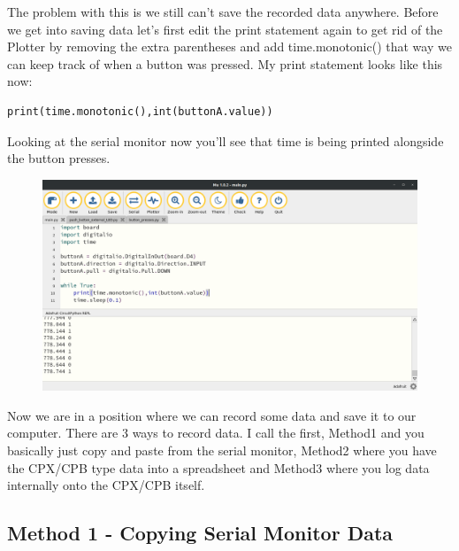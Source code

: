 The problem with this is we still can’t save the recorded data
anywhere. Before we get into saving data let’s first edit the print
statement again to get rid of the Plotter by removing the extra
parentheses and add time.monotonic() that way we can keep track of
when a button was pressed. My print statement looks like this now: 
\begin{verbatim}
print(time.monotonic(),int(buttonA.value))
\end{verbatim}
Looking at the serial monitor now you’ll see that time is being
printed alongside the button presses. 
\begin{figure}[H]
  \begin{center}
    \includegraphics[width=\textwidth]{Figures/MuPlotterTime.png}
  \end{center}
\end{figure}
Now we are in a position where we can record some data and save it to
our computer. There are 3 ways to record data. I call the first,
Method1 and you basically just copy and paste from the serial monitor,
Method2 where you have the CPX/CPB type data into a spreadsheet and
Method3 where you log data internally onto the CPX/CPB itself.

\subsection{Method 1 - Copying Serial Monitor Data}

